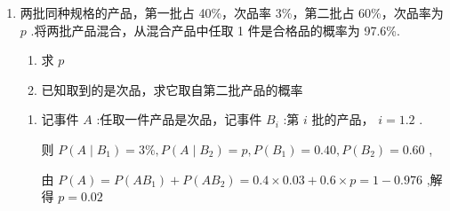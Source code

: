\begin{enumerate}
\begin{enumerate}
\begin{jieda}
\begin{enumerate}
                \item 设“取出的是甲袋”为事件 ${A}_{1}$ ，“取出的是乙袋”为事件 ${A}_{2}$ ，“第一次取出的球是红球”为事件 $B$ ， “第二次取出的球是白球”为事件 $C$ ，则 $P\left( {A}_{1}\right)  = P\left( {A}_{2}\right)  = \dfrac{1}{2}$
                
                $P\left( {{BC} \mid  {A}_{1}}\right)  = \dfrac{2 \times  4}{6 \times  5} = \dfrac{4}{15},P\left( {{BC} \mid  {A}_{2}}\right)  = \dfrac{2 \times  2}{4 \times  3} = \dfrac{1}{3}.$
                
                故 $P\left( {BC}\right)  = P\left( {A}_1\right) P\left( {{BC} \mid  {A}_{1}}\right)  + P\left( {A}_{2}\right) P\left( {{BC} \mid  {A}_{2}}\right)  = \dfrac{1}{2} \times  \dfrac{4}{15} + \dfrac{1}{2} \times  \dfrac{1}{3} = \dfrac{3}{10}$ ,
                
                $P\left( B\right)  = P\left( {A}_{1}\right) P\left( {B \mid  {A}_{1}}\right)  + P\left( {A}_{2}\right) P\left( {B \mid  {A}_{2}}\right)  = \dfrac{1}{2} \times  \dfrac{1}{3} + \dfrac{1}{2} \times  \dfrac{1}{2} = \dfrac{5}{12}$
                
                所以 $P\left( {C \mid  B}\right)  = \dfrac{P\left( {BC}\right) }{P\left( B\right) } = \dfrac{18}{25}$
            \end{enumerate}
        \end{jieda}
        \item 两批同种规格的产品，第一批占 40\%，次品率 3\%，第二批占 60\%，次品率为 $p$ .将两批产品混合，从混合产品中任取 1 件是合格品的概率为 97.6\%.
        \begin{enumerate}
            \item 求 $p$
            \item 已知取到的是次品，求它取自第二批产品的概率
        \end{enumerate}
        \begin{jieda}
            \begin{enumerate}
                \item 记事件 $A$ :任取一件产品是次品，记事件 ${B}_{i}$ :第 $i$ 批的产品， $i = {1.2}$ .

                则 $P\left( {A \mid  {B}_{1}}\right)  = 3\% ,P\left( {A \mid  {B}_{2}}\right)  = p,P\left( {B}_{1}\right)  = {0.40},P\left( {B}_{2}\right)  = {0.60}$ ,
                
                由 $P\left( A\right)  = P\left( {A{B}_{1}}\right)  + P\left( {A{B}_{2}}\right)  = {0.4} \times  {0.03} + {0.6} \times  p = 1 - {0.976}$ ,解得 $p = {0.02}$


\end{enumerate}
\end{jieda}
\end{enumerate}
\end{enumerate}
